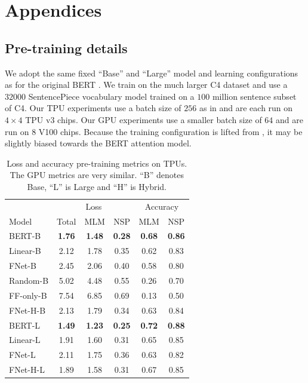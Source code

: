 \clearpage

\section{Appendices}
\label{sec:appendix}


\subsection{Pre-training details}
\label{app:mlm}

We adopt the same fixed ``Base'' and ``Large'' model and learning configurations as for the original BERT \citep{devlin2018bert}. We train on the much larger C4 dataset \citep{raffel2019exploring} and use a $32000$ SentencePiece  vocabulary model \citep{kudo2018sentencepiece} trained on a $100$ million sentence subset of C4. Our TPU experiments use a batch size of $256$ as in \citet{devlin2018bert} and are each run on $4\times4$ TPU v3 chips. Our GPU experiments use a smaller batch size of $64$ and are run on $8$ V100 chips. Because the training configuration is lifted from \citet{devlin2018bert}, it may be slightly biased towards the BERT attention model.

\begin{table}
    \caption{Loss and accuracy pre-training metrics on TPUs. The GPU metrics are very similar. ``B'' denotes Base, ``L'' is Large and ``H'' is Hybrid.}
    \label{tab:pretraining_metrics}
    \setlength{\tabcolsep}{4.5pt}
    \centering
    \begin{tabular}{l| c c c | c c}
        \hline
         & \multicolumn{3}{c|}{Loss} & \multicolumn{2}{c}{Accuracy} \\ 
         Model & Total & MLM & NSP & MLM & NSP \\ \hline \hline
         BERT-B & \textbf{1.76} & \textbf{1.48} & \textbf{0.28} & \textbf{0.68} & \textbf{0.86} \\ 
         Linear-B & 2.12 & 1.78 & 0.35 & 0.62 & 0.83 \\ 
         FNet-B & 2.45 & 2.06 & 0.40 & 0.58 & 0.80 \\
         Random-B & 5.02 & 4.48 & 0.55 & 0.26 & 0.70 \\ 
         FF-only-B & 7.54 & 6.85 & 0.69 & 0.13 & 0.50 \\
         FNet-H-B & 2.13 & 1.79 & 0.34 & 0.63 & 0.84 \\ \hline
         BERT-L & \textbf{1.49} & \textbf{1.23} & \textbf{0.25} & \textbf{0.72} & \textbf{0.88} \\ 
         Linear-L & 1.91 & 1.60 & 0.31 & 0.65 & 0.85 \\ 
         FNet-L & 2.11 & 1.75 & 0.36 & 0.63 & 0.82 \\
         FNet-H-L & 1.89 & 1.58 & 0.31 & 0.67 & 0.85 \\\hline
    \end{tabular}
\end{table}


